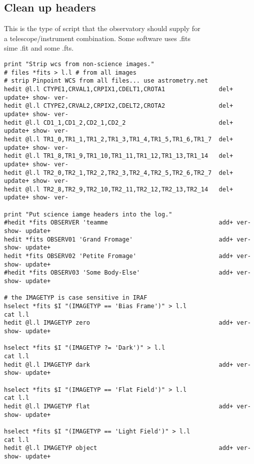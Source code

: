 \documentclass[letter,11pt,oneside]{article}
\begin{document}
\begin{landscape}
\section*{Clean up headers}

This is the type of script that the observatory should supply for\\
a telescope/instrument combination. Some software uses .fits \\
sime .fit and some .fts.


\begingroup \fontsize{10pt}{10pt}
\selectfont
\begin{verbatim} 
print "Strip wcs from non-science images."
# files *fits > l.l # from all images
# strip Pinpoint WCS from all files... use astrometry.net
hedit @l.l CTYPE1,CRVAL1,CRPIX1,CDELT1,CROTA1               del+ update+ show- ver-
hedit @l.l CTYPE2,CRVAL2,CRPIX2,CDELT2,CROTA2               del+ update+ show- ver-
hedit @l.l CD1_1,CD1_2,CD2_1,CD2_2                          del+ update+ show- ver-
hedit @l.l TR1_0,TR1_1,TR1_2,TR1_3,TR1_4,TR1_5,TR1_6,TR1_7  del+ update+ show- ver-
hedit @l.l TR1_8,TR1_9,TR1_10,TR1_11,TR1_12,TR1_13,TR1_14   del+ update+ show- ver-
hedit @l.l TR2_0,TR2_1,TR2_2,TR2_3,TR2_4,TR2_5,TR2_6,TR2_7  del+ update+ show- ver-
hedit @l.l TR2_8,TR2_9,TR2_10,TR2_11,TR2_12,TR2_13,TR2_14   del+ update+ show- ver-

print "Put science iamge headers into the log."
#hedit *fits OBSERVER 'teamme                               add+ ver- show- update+
hedit *fits OBSERV01 'Grand Fromage'                        add+ ver- show- update+
hedit *fits OBSERV02 'Petite Fromage'                       add+ ver- show- update+
#hedit *fits OBSERV03 'Some Body-Else'                      add+ ver- show- update+

# the IMAGETYP is case sensitive in IRAF
hselect *fits $I "(IMAGETYP == 'Bias Frame')" > l.l
cat l.l
hedit @l.l IMAGETYP zero                                    add+ ver- show- update+

hselect *fits $I "(IMAGETYP ?= 'Dark')" > l.l
cat l.l
hedit @l.l IMAGETYP dark                                    add+ ver- show- update+

hselect *fits $I "(IMAGETYP == 'Flat Field')" > l.l
cat l.l
hedit @l.l IMAGETYP flat                                    add+ ver- show- update+

hselect *fits $I "(IMAGETYP == 'Light Field')" > l.l
cat l.l
hedit @l.l IMAGETYP object                                  add+ ver- show- update+


\end{verbatim}
\end{landscape}
\end{document}
